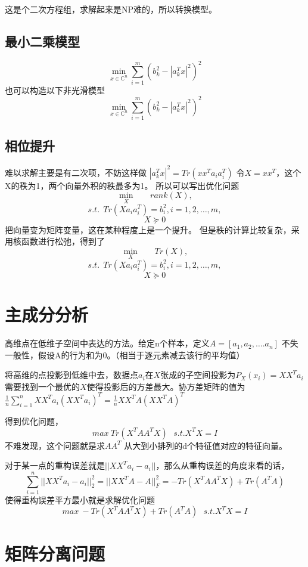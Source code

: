 \documentclass{article}
\begin{document}
这是个二次方程组，求解起来是NP难的，所以转换模型。
\subsection{最小二乘模型}
$$
\min\limits_{x \in \mathbb{C}^n} \sum\limits^m_{i=1}(b_k^2-|a_k^T x|^2)^2
$$
也可以构造以下非光滑模型
$$
\min\limits_{x \in \mathbb{C}^n} \sum\limits^m_{i=1}(b_k^2-|a_k^T x|^2)^2
$$
\subsection{相位提升}
难以求解主要是有二次项，不妨这样做
$|a_k^T x|^2=Tr(xx^Ta_ia_i^T)$
令$X=xx^T$，这个X的秩为1，两个向量外积的秩最多为1。
所以可以写出优化问题
$$
\min\limits_{X} \ \ \ \ \ \ \  \ rank(X),
$$
$$
s.t. \ \ Tr(Xa_ia_i^T)=b_i^2,i=1,2,\dots,m,
$$
$$
X \succeq 0
$$
把向量变为矩阵变量，这在某种程度上是一个提升。
但是秩的计算比较复杂，采用核函数进行松弛，得到了
$$
\min\limits_{X} \ \ \ \ \ \ \  \ Tr(X),
$$
$$
s.t. \ \ Tr(Xa_ia_i^T)=b_i^2,i=1,2,\dots,m,
$$
$$
X \succeq 0
$$
\section{主成分分析}
高维点在低维子空间中表达的方法。给定n个样本，定义$A=[a_1,a_2,\dots.a_n]$
不失一般性，假设A的行为和为0。（相当于逐元素减去该行的平均值）

将高维的点投影到低维中去，数据点$a_i$在$X$张成的子空间投影为$P_X(x_i)=XX^Ta_i$
需要找到一个最优的$X$使得投影后的方差最大。协方差矩阵的值为$\frac{1}{n} \sum\limits_{i=1}^n X X^T a_i (XX^Ta_i)^T=\frac{1}{n}  X X^T A (XX^TA)^T$

得到优化问题，$$max \ Tr(X^T AA^TX) \ \  \ s.t. X^TX=I$$
不难发现，这个问题就是求$AA^T$
从大到小排列的d个特征值对应的特征向量。

对于某一点的重构误差就是$||XX^Ta_i-a_i||$，那么从重构误差的角度来看的话，
$$
\sum\limits_{i=1}^n ||XX^Ta_i-a_i||^2_2=||XX^TA-A||^2_F=-Tr(X^TAA^TX)+Tr(A^TA)
$$
使得重构误差平方最小就是求解优化问题
$$max \ -Tr(X^TAA^TX)+Tr(A^TA) \ \  \ s.t. X^TX=I$$

\section{矩阵分离问题}
\end{document}
